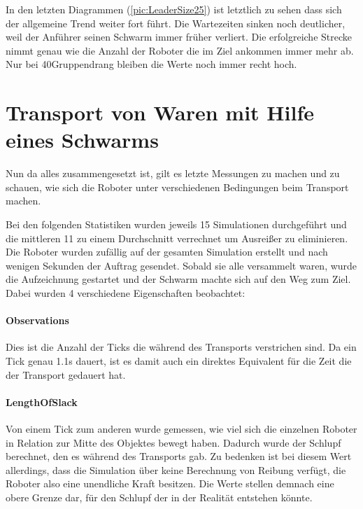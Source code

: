In den letzten Diagrammen (\autoref{pic:LeaderSize25}) ist letztlich zu sehen dass sich der allgemeine Trend weiter fort führt. Die Wartezeiten sinken noch deutlicher, weil der Anführer seinen Schwarm immer früher verliert. Die erfolgreiche Strecke nimmt genau wie die Anzahl der Roboter die im Ziel ankommen immer mehr ab. Nur bei 40\per Gruppendrang bleiben die Werte noch immer recht hoch.











\section{Transport von Waren mit Hilfe eines Schwarms}\label{sec:EvaluationTransport}

Nun da alles zusammengesetzt ist, gilt es letzte Messungen zu machen und zu schauen, wie sich die Roboter unter verschiedenen Bedingungen beim Transport machen.

Bei den folgenden Statistiken wurden jeweils 15 Simulationen durchgeführt und die mittleren 11 zu einem Durchschnitt verrechnet um Ausreißer zu eliminieren. Die Roboter wurden zufällig auf der gesamten Simulation erstellt und nach wenigen Sekunden der Auftrag gesendet. Sobald sie alle versammelt waren, wurde die Aufzeichnung gestartet und der Schwarm machte sich auf den Weg zum Ziel. Dabei wurden 4 verschiedene Eigenschaften beobachtet:

\paragraph*{Observations}
Dies ist die Anzahl der Ticks die während des Transports verstrichen sind. Da ein Tick genau 1.1s dauert, ist es damit auch ein direktes Equivalent für die Zeit die der Transport gedauert hat.

\paragraph*{LengthOfSlack}
Von einem Tick zum anderen wurde gemessen, wie viel sich die einzelnen Roboter in Relation zur Mitte des Objektes bewegt haben. Dadurch wurde der Schlupf berechnet, den es während des Transports gab. Zu bedenken ist bei diesem Wert allerdings, dass die Simulation über keine Berechnung von Reibung verfügt, die Roboter also eine unendliche Kraft besitzen. Die Werte stellen demnach eine obere Grenze dar, für den Schlupf der in der Realität entstehen könnte.


